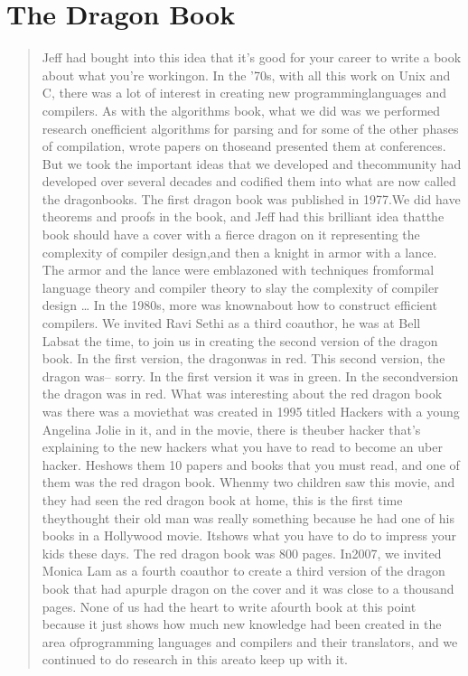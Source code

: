 \section{The Dragon Book}
\begin{quotation}
    Jeff had bought into this idea that it's good for your career to write a 
book about what you're workingon. In the '70s, with all this work on Unix and 
C, there was a lot of interest in creating new programminglanguages and 
compilers. As with the algorithms book, what we did was we performed research 
onefficient algorithms for parsing and for some of the other phases of 
compilation, wrote papers on thoseand presented them at conferences. But we 
took the important ideas that we developed and thecommunity had developed over 
several decades and codified them into what are now called the dragonbooks. The 
first dragon book was published in 1977.We did have theorems and proofs in the 
book, and Jeff had this brilliant idea thatthe book should have a cover with a 
fierce dragon on it representing the complexity of compiler design,and then a 
knight in armor with a lance. The armor and the lance were emblazoned with 
techniques fromformal language theory and compiler theory to slay the 
complexity of compiler design
\dots
In the 1980s, more was knownabout how to construct efficient compilers. We 
invited Ravi Sethi as a third coauthor, he was at Bell Labsat the time, to join 
us in creating the second version of the dragon book. In the first version, the 
dragonwas in red. This second version, the dragon was-- sorry. In the first 
version it was in green. In the secondversion the dragon was in red. What was 
interesting about the red dragon book was there was a moviethat was created in 
1995 titled Hackers with a young Angelina Jolie in it, and in the movie, there 
is theuber hacker that's explaining to the new hackers what you have to read to 
become an uber hacker. Heshows them 10 papers and books that you must read, and 
one of them was the red dragon book. Whenmy two children saw this movie, and 
they had seen the red dragon book at home, this is the first time theythought 
their old man was really something because he had one of his books in a 
Hollywood movie. Itshows what you have to do to impress your kids these days. 
The red dragon book was 800 pages. In2007, we invited Monica Lam as a fourth 
coauthor to create a third version of the dragon book that had apurple dragon 
on the cover and it was close to a thousand pages. None of us had the heart to 
write afourth book at this point because it just shows how much new knowledge 
had been created in the area ofprogramming languages and compilers and their 
translators, and we continued to do research in this areato keep up with it.
\cite{aho_oral_history_2022}
\end{quotation}
